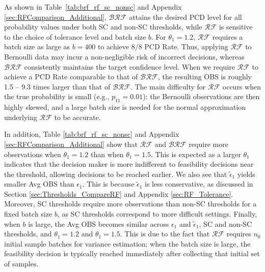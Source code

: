 \documentclass[11pt]{article}
\begin{document}
As shown in Table~\ref{tab:brf_rf_sc_nonsc} and Appendix \ref{sec:RFComparison_Additional}, $\mathcal{BRF}$ attains the desired PCD level for all probability values under both SC and non-SC thresholds, while $\mathcal{RF}$ is sensitive to the choice of tolerance level and batch size $b$.
For $\theta_1=1.2$, $\mathcal{RF}$ requires a batch size as large as $b=400$ to achieve $8/8$ PCD Rate. 
Thus, applying $\mathcal{RF}$ to Bernoulli data may incur a non-negligible risk of incorrect decisions, whereas $\mathcal{BRF}$ consistently maintains the target confidence level.
When we require $\mathcal{RF}$ to achieve a PCD Rate comparable to that of $\mathcal{BRF}$, the resulting OBS is roughly 1.5 -- 9.3 times larger than that of $\mathcal{BRF}$.
The main difficulty for $\mathcal{RF}$ occurs when the true probability is small (e.g., $p_{11}=0.01$): the Bernoulli observations are then highly skewed, and a large batch size is needed for the normal approximation underlying $\mathcal{RF}$ to be accurate. 

In addition, Table \ref{tab:brf_rf_sc_nonsc} and Appendix \ref{sec:RFComparison_Additional} show that $\mathcal{RF}$ and $\mathcal{BRF}$ require more observations when $\theta_1=1.2$ than when $\theta_1=1.5$. This is expected as a larger $\theta_1$ indicates that the decision maker is more indifferent to feasibility decisions near the threshold, allowing decisions to be reached earlier. We also see that $\tilde{\epsilon}_1$ yields smaller Avg OBS than $\epsilon_1$. This is because $\tilde{\epsilon}_1$ is less conservative, as discussed in Section \ref{sec:Thresholds_CompareRF} and Appendix \ref{sec:RF_Tolerance}. Moreover, SC thresholds require more observations than non-SC thresholds for a fixed batch size $b$, as SC thresholds correspond to more difficult settings. %
Finally, when $b$ is large, the Avg OBS becomes similar across $\epsilon_1$ and $\tilde{\epsilon}_1$, SC and non-SC thresholds, and $\theta_1=1.2$ and $\theta_1=1.5$. 
This is due to the fact that $\mathcal{RF}$ requires $n_0$ initial sample batches for variance estimation; when the batch size is large, the feasibility decision is typically reached immediately after collecting that initial set of samples.
\end{document}
